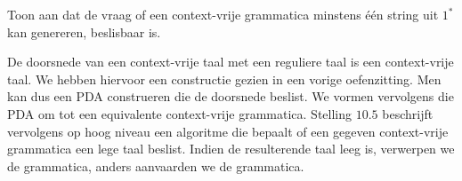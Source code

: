 \documentclass[a4paper]{article}
\begin{document}
\begin{question}
Toon aan dat de vraag of een context-vrije grammatica minstens \'e\'en string uit $1^*$ kan genereren, beslisbaar is.
\begin{answer}
De doorsnede van een context-vrije taal met een reguliere taal is een context-vrije taal. We hebben hiervoor een constructie gezien in een vorige oefenzitting. Men kan dus een PDA construeren die de doorsnede beslist. We vormen vervolgens die PDA om tot een equivalente context-vrije grammatica. Stelling $10.5$ beschrijft vervolgens op hoog niveau een algoritme die bepaalt of een gegeven context-vrije grammatica een lege taal beslist. Indien de resulterende taal leeg is, verwerpen we de grammatica, anders aanvaarden we de grammatica.
\end{answer}
\end{question}
\end{document}
